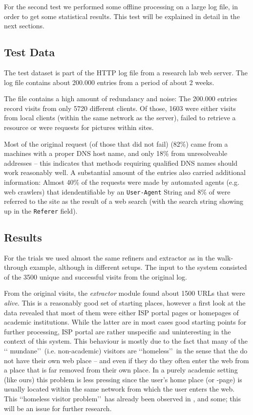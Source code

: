 \documentclass[a4paper]{danarticle}
\theoremstyle{remark}
\begin{document}
    For the second test we performed some offline processing on a large log 
    file, in order to get some statistical results. This test will be explained 
    in detail in the next sections.
    \subsection{Test Data}
      The test dataset is part of the HTTP log file from a research lab
      web server. The log file contains about 200.000 entries from a period of
      about 2 weeks.
      
      The file contains a high amount of redundancy and noise: The 200.000 
      entries record visits from only 5720 different clients. Of those, 1603 
      were either visits from local clients (within the same network as the 
      server), failed to retrieve a resource or were requests for pictures 
      within sites.
      
      Most of the original request (of those that did not fail) (82\%) came from a 
      machines with a proper
      DNS host name, and only 18\% from unresolveable addresses -- this indicates
      that methods requiring qualified DNS names should work reasonably well. A
      substantial amount of the entries also carried additional information:
      Almost 40\% of the requests were made by automated agents (e.g. web
      crawlers) that idendentifiable by an \verb$User-Agent$ String and 8\% of
      were referred to the site as the result of a web search (with the search
      string showing up in the \verb$Referer$ field). 
    \subsection{Results}
      For the trials we used almost the same refiners and extractor as in the
      walk-through example, although in different setups. The input to the 
      system consisted of the 3500 unique and successful visits from the original 
      log. 
      
      From the original visits, 
      the \textit{extractor} module found about 1500 URLs that
      were \textit{alive}. This is a reasonably good set of starting places,
      however a first look at the data revealed that most of them were either
      ISP portal pages or homepages of academic institutions. While the latter
      are in most cases good starting points for further processing, ISP portal
      are rather unspecific and uninteresting in the context of this system.
      This behaviour is mostly due to the fact that many of the \lq\lq
      mundane\rq\rq\ (i.e. non-academic) visitors are \lq\lq homeless\rq\rq\ in
      the sense that the do not have their own web place -- and even if they do
      they often enter the web from a place that is far removed from their own
      place. In a purely academic setting (like ours) this problem is less
      pressing since the user's home place (or -page) is usually located within
      the same network from which the user enters the web. This \lq\lq homeless
      visitor problem\rq\rq\ has already been observed in \cite{webaware}, and 
      some; this will be an issue for further research.
      
\end{document}
